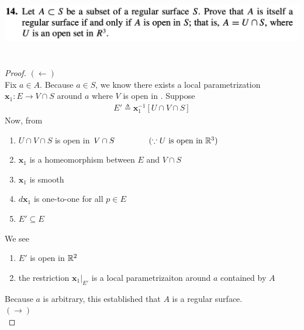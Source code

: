 \documentclass{report}
\begin{document}
\begin{question}{}{}
\includegraphics[height=3cm,width=18cm]{HW3a2}
\end{question}
\begin{proof}
$(\longleftarrow)$\\

Fix $a \in A$. Because $a \in S$, we know there exists a local parametrization $\textbf{x}_1:E\rightarrow V\cap S$ around $a$ where $V$ is open in  . Suppose 
\begin{align*}
  E'\triangleq \textbf{x}_1^{-1}[ U\cap V\cap S]
\end{align*}
Now, from 
\begin{enumerate}[label=(\alph*)]
  \item $U\cap V\cap S$ is open in $V\cap S\hspace{1.5cm}(\because U\text{ is open in }\mathbb{R}^3)$ 
  \item $\textbf{x}_1$ is a homeomorphism between $E$ and $V\cap S$ 
  \item $\textbf{x}_1$ is smooth 
  \item $d\textbf{x}_1$ is one-to-one for all $p \in E$
  \item $E'\subseteq E$
\end{enumerate}
We see 
\begin{enumerate}[label=(\alph*)]
  \item $E'$ is open in  $\mathbb{R}^2$
  \item the restriction $\textbf{x}_1|_{E'}$ is a local parametrizaiton around $a$ contained by $A$ 
\end{enumerate}
Because $a$ is arbitrary, this established that $A$ is a regular surface.\\

$(\longrightarrow)$\\


\end{proof}
\end{document}
